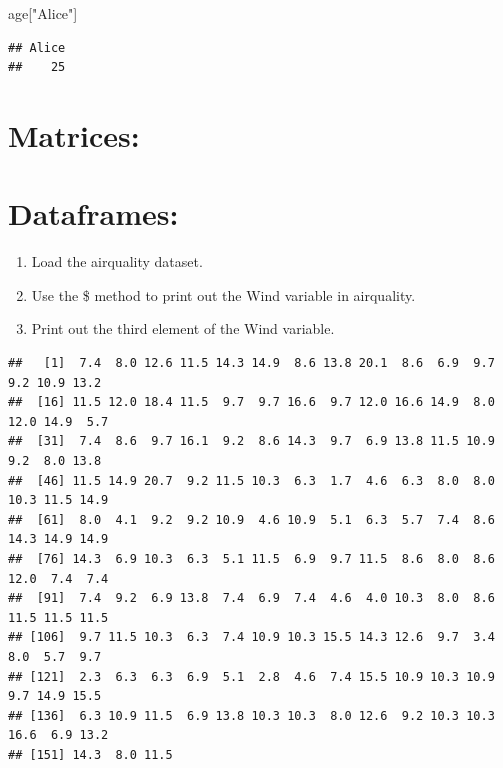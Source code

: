 \documentclass[
]{article}
\newenvironment{Shaded}{\begin{snugshade}}{\end{snugshade}}
\newcommand{\FunctionTok}[1]{\textcolor[rgb]{0.13,0.29,0.53}{\textbf{#1}}}
\newcommand{\NormalTok}[1]{#1}
\newcommand{\SpecialCharTok}[1]{\textcolor[rgb]{0.81,0.36,0.00}{\textbf{#1}}}
\newcommand{\StringTok}[1]{\textcolor[rgb]{0.31,0.60,0.02}{#1}}
\providecommand{\tightlist}{%
  \setlength{\itemsep}{0pt}\setlength{\parskip}{0pt}}
\begin{document}
\begin{Shaded}
\begin{Highlighting}[]
\NormalTok{age[}\StringTok{"Alice"}\NormalTok{]}
\end{Highlighting}
\end{Shaded}

\begin{verbatim}
## Alice 
##    25
\end{verbatim}

\section{Matrices:}\label{matrices}

\section{Dataframes:}\label{dataframes}

\begin{enumerate}
\def\labelenumi{\arabic{enumi}.}
\setcounter{enumi}{12}
\tightlist
\item
  Load the airquality dataset.
\item
  Use the \$ method to print out the Wind variable in airquality.
\item
  Print out the third element of the Wind variable.
\end{enumerate}

\begin{Shaded}
\end{Shaded}

\begin{verbatim}
##   [1]  7.4  8.0 12.6 11.5 14.3 14.9  8.6 13.8 20.1  8.6  6.9  9.7  9.2 10.9 13.2
##  [16] 11.5 12.0 18.4 11.5  9.7  9.7 16.6  9.7 12.0 16.6 14.9  8.0 12.0 14.9  5.7
##  [31]  7.4  8.6  9.7 16.1  9.2  8.6 14.3  9.7  6.9 13.8 11.5 10.9  9.2  8.0 13.8
##  [46] 11.5 14.9 20.7  9.2 11.5 10.3  6.3  1.7  4.6  6.3  8.0  8.0 10.3 11.5 14.9
##  [61]  8.0  4.1  9.2  9.2 10.9  4.6 10.9  5.1  6.3  5.7  7.4  8.6 14.3 14.9 14.9
##  [76] 14.3  6.9 10.3  6.3  5.1 11.5  6.9  9.7 11.5  8.6  8.0  8.6 12.0  7.4  7.4
##  [91]  7.4  9.2  6.9 13.8  7.4  6.9  7.4  4.6  4.0 10.3  8.0  8.6 11.5 11.5 11.5
## [106]  9.7 11.5 10.3  6.3  7.4 10.9 10.3 15.5 14.3 12.6  9.7  3.4  8.0  5.7  9.7
## [121]  2.3  6.3  6.3  6.9  5.1  2.8  4.6  7.4 15.5 10.9 10.3 10.9  9.7 14.9 15.5
## [136]  6.3 10.9 11.5  6.9 13.8 10.3 10.3  8.0 12.6  9.2 10.3 10.3 16.6  6.9 13.2
## [151] 14.3  8.0 11.5
\end{verbatim}
\end{document}
